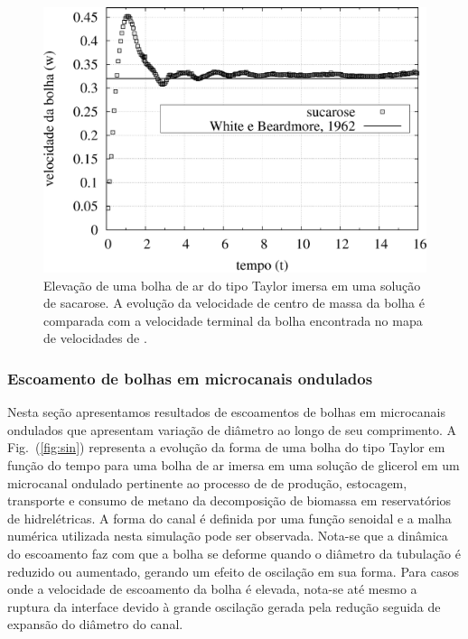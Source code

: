 \documentclass[a4paper,portuges,12pt]{article}
\begin{document}
 \begin{figure}[h]
 	\begin{center}
 		\includegraphics[angle=0, scale=0.5]{figs/sucrose.pdf}
 	\end{center}
	\caption{Elevação de uma bolha de ar do tipo Taylor imersa em uma
	solução de sacarose. A evolução da velocidade de centro de massa da
	bolha é comparada com a velocidade terminal da bolha encontrada no
	mapa de velocidades de \cite{white1962}.}
   \label{fig:sucroseVel}
 \end{figure}

\subsubsection{Escoamento de bolhas em microcanais ondulados}

Nesta seção apresentamos resultados de escoamentos de bolhas em
microcanais ondulados que apresentam variação de diâmetro ao longo de
seu comprimento.  A Fig.~(\ref{fig:sin}) representa a evolução da forma
de uma bolha do tipo Taylor em função do tempo para uma bolha de ar
imersa em uma solução de glicerol em um microcanal ondulado pertinente
ao processo de de produção, estocagem, transporte e consumo de metano da
decomposição de biomassa em reservatórios de hidrelétricas. A forma do
canal é definida por uma função senoidal e a malha numérica utilizada
nesta simulação pode ser observada. Nota-se que a dinâmica do escoamento
faz com que a bolha se deforme quando o diâmetro da tubulação é reduzido
ou aumentado, gerando um efeito de oscilação em sua forma. Para casos
onde a velocidade de escoamento da bolha é elevada, nota-se até mesmo a
ruptura da interface devido à grande oscilação gerada pela redução
seguida de expansão do diâmetro do canal.
\end{document}
